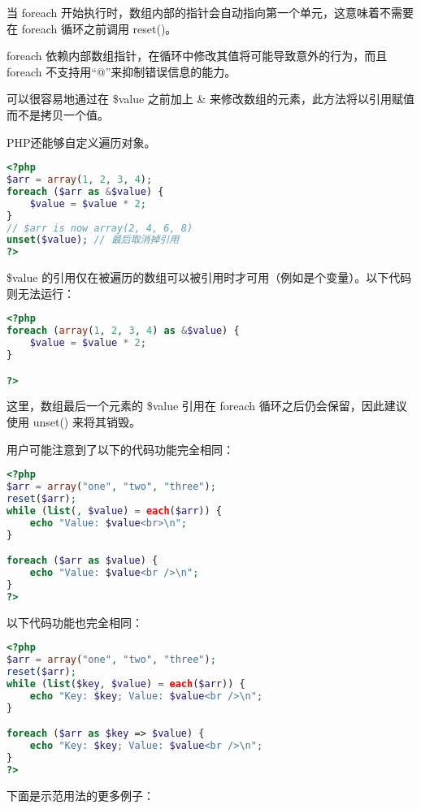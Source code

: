 当 foreach 开始执行时，数组内部的指针会自动指向第一个单元，这意味着不需要在 foreach 循环之前调用 reset()。

foreach 依赖内部数组指针，在循环中修改其值将可能导致意外的行为，而且foreach 不支持用“@”来抑制错误信息的能力。


可以很容易地通过在 \$value 之前加上 \& 来修改数组的元素，此方法将以引用赋值而不是拷贝一个值。


PHP还能够自定义遍历对象。



\begin{lstlisting}[language=PHP]
<?php
$arr = array(1, 2, 3, 4);
foreach ($arr as &$value) {
    $value = $value * 2;
}
// $arr is now array(2, 4, 6, 8)
unset($value); // 最后取消掉引用
?>
\end{lstlisting}

\$value 的引用仅在被遍历的数组可以被引用时才可用（例如是个变量）。以下代码则无法运行：


\begin{lstlisting}[language=PHP]
<?php
foreach (array(1, 2, 3, 4) as &$value) {
    $value = $value * 2;
}

?>
\end{lstlisting}

这里，数组最后一个元素的 \$value 引用在 foreach 循环之后仍会保留，因此建议使用 unset() 来将其销毁。

用户可能注意到了以下的代码功能完全相同：

\begin{lstlisting}[language=PHP]
<?php
$arr = array("one", "two", "three");
reset($arr);
while (list(, $value) = each($arr)) {
    echo "Value: $value<br>\n";
}

foreach ($arr as $value) {
    echo "Value: $value<br />\n";
}
?>
\end{lstlisting}

以下代码功能也完全相同：

\begin{lstlisting}[language=PHP]
<?php
$arr = array("one", "two", "three");
reset($arr);
while (list($key, $value) = each($arr)) {
    echo "Key: $key; Value: $value<br />\n";
}

foreach ($arr as $key => $value) {
    echo "Key: $key; Value: $value<br />\n";
}
?>
\end{lstlisting}


下面是示范用法的更多例子：

